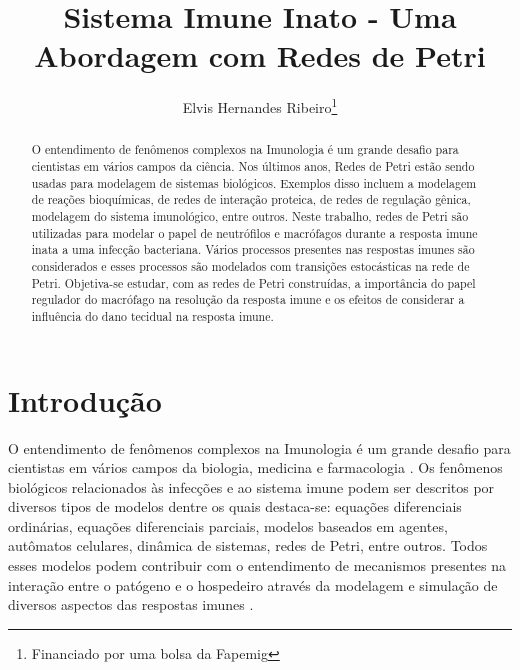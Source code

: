 \documentclass[a4paper,10pt]{article}
\title{Sistema Imune Inato - Uma Abordagem com Redes de Petri}
\author{Elvis Hernandes Ribeiro\thanks{Financiado por uma bolsa da Fapemig}}
\begin{document}
    \maketitle

    \begin{abstract}				
		O entendimento de fenômenos complexos na Imunologia é um grande desafio para cientistas em vários campos da ci\^encia. 
		Nos últimos anos, Redes de Petri estão sendo usadas para modelagem de sistemas biológicos. Exemplos disso incluem 
		a modelagem de reações bioquímicas, de redes de interação proteica, de redes de regulação gênica, 
		modelagem do sistema imunológico, entre outros. 
		Neste trabalho, redes de Petri são utilizadas para modelar o papel de neutrófilos e macrófagos durante a resposta imune inata a uma infecção bacteriana. 
		Vários processos presentes nas respostas imunes são considerados e esses processos são modelados com transições estocásticas na rede de Petri. 
		Objetiva-se estudar, com as redes de Petri construídas, a importância do papel regulador do macrófago na resolução da resposta imune e os efeitos 
		de considerar a influência do dano tecidual na resposta imune. 
    \end{abstract}

    \newpage 
		\tableofcontents
    \newpage

    \section{Introdução}
    
		
		
		O entendimento de fenômenos complexos na Imunologia é um grande desafio para cientistas em vários campos 
		da biologia, medicina e farmacologia \cite{Carvalho2015}. Os fenômenos biológicos relacionados às infecções e ao sistema imune 
		podem ser descritos por diversos tipos de modelos dentre os quais destaca-se: equações diferenciais ordinárias, 
		equações diferenciais parciais, modelos baseados em agentes, autômatos celulares, dinâmica de sistemas, 
		redes de Petri, entre outros. Todos esses modelos podem contribuir com o entendimento de mecanismos presentes 
		na interação entre o patógeno e o hospedeiro através da modelagem e simulação de diversos aspectos das 
		respostas imunes \cite{Carvalho2015}.  
		
\end{document}
